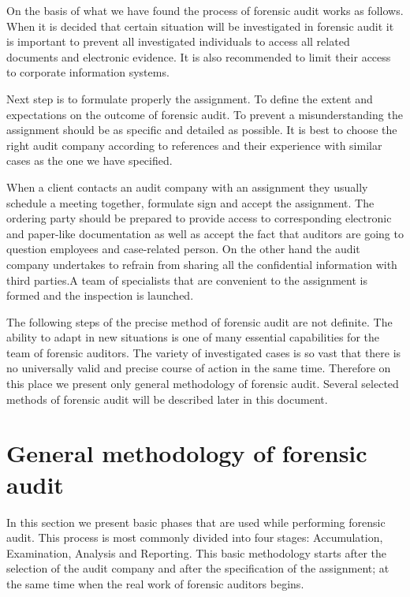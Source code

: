 On the basis of what we have found the process of forensic audit works as follows. When it is decided that certain situation will be investigated in forensic audit it is important to prevent all investigated individuals to access all related documents and electronic evidence. It is also recommended to limit their access to corporate information systems. 

Next step is to formulate properly the assignment. To define the extent and expectations on the outcome of forensic audit. To prevent a misunderstanding the assignment should be as specific and detailed as possible. It is best to choose the right audit company according to references and their experience with similar cases as the one we have specified.

When a client contacts an audit company with an assignment they usually schedule a meeting together, formulate sign and accept the assignment. The ordering party should be prepared to provide access to corresponding electronic and paper-like documentation as well as accept the fact that auditors are going to question employees and case-related person. On the other hand the audit company undertakes to refrain from sharing all the confidential information with third parties.A team of specialists that are convenient to the assignment is formed and the inspection is launched. 

The following steps of the precise method of forensic audit are not definite. The ability to adapt in new situations is one of many essential capabilities for the team of forensic auditors. The variety of investigated cases is so vast that there is no universally valid and precise course of action in the same time. Therefore on this place we present only general methodology of forensic audit. Several selected methods of forensic audit will be described later in this document. 

\section{General methodology of forensic audit}
In this section we present basic phases that are used while performing forensic audit. This process is most commonly divided into four stages: Accumulation, Examination, Analysis and Reporting. This basic methodology starts after the  selection of the audit company and after the specification of the assignment; at the same time when the real work of forensic auditors begins.

